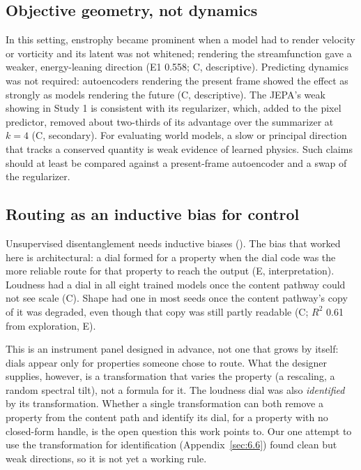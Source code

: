 \documentclass[10pt]{article}
\begin{document}
\subsection{Objective geometry, not dynamics}\label{sec:7.2}

In this setting, enstrophy became prominent when a model had to render velocity or vorticity and its latent was not whitened; rendering the streamfunction gave a weaker, energy-leaning direction (E1 0.558; C, descriptive). Predicting dynamics was not required: autoencoders rendering the present frame showed the effect as strongly as models rendering the future (C, descriptive). The JEPA's weak showing in Study 1 is consistent with its regularizer, which, added to the pixel predictor, removed about two-thirds of its advantage over the summarizer at $k = 4$ (C, secondary). For evaluating world models, a slow or principal direction that tracks a conserved quantity is weak evidence of learned physics. Such claims should at least be compared against a present-frame autoencoder and a swap of the regularizer.

\subsection{Routing as an inductive bias for control}\label{sec:7.3}

Unsupervised disentanglement needs inductive biases (\citealp{locatello2019challenging}). The bias that worked here is architectural: a dial formed for a property when the dial code was the more reliable route for that property to reach the output (E, interpretation). Loudness had a dial in all eight trained models once the content pathway could not see scale (C). Shape had one in most seeds once the content pathway's copy of it was degraded, even though that copy was still partly readable (C; $R^2$ 0.61 from exploration, E).

This is an instrument panel designed in advance, not one that grows by itself: dials appear only for properties someone chose to route. What the designer supplies, however, is a transformation that varies the property (a rescaling, a random spectral tilt), not a formula for it. The loudness dial was also \emph{identified} by its transformation. Whether a single transformation can both remove a property from the content path and identify its dial, for a property with no closed-form handle, is the open question this work points to. Our one attempt to use the transformation for identification (Appendix~\ref{sec:6.6}) found clean but weak directions, so it is not yet a working rule.
\end{document}
